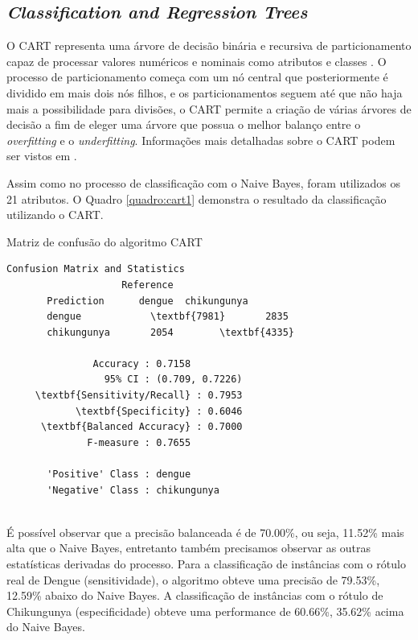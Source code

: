 \subsection{\textit{Classification and Regression Trees}}

O CART representa uma árvore de decisão binária e recursiva de particionamento capaz de processar valores numéricos e nominais como atributos e classes \cite{steinberg2009cart}. O processo de particionamento começa com um nó central que posteriormente é dividido em mais dois nós filhos, e os particionamentos seguem até que não haja mais a possibilidade para divisões, o CART permite a criação de várias árvores de decisão a fim de eleger uma árvore que possua o melhor balanço entre o \textit{overfitting} e o \textit{underfitting}. Informações mais detalhadas sobre o CART podem ser vistos em .

Assim como no processo de classificação com o Naive Bayes, foram utilizados os 21 atributos. O Quadro \ref{quadro:cart1} demonstra o resultado da classificação utilizando o CART.


\begin{quadro}
\caption{\label{quadro:cart1}Matriz de confusão do algoritmo CART}
\begingroup
    \fontsize{10pt}{9pt}\selectfont
    \begin{Verbatim}[commandchars=\\\{\}]
      Confusion Matrix and Statistics
                    Reference
       Prediction      dengue  chikungunya
       dengue            \textbf{7981}       2835
       chikungunya       2054        \textbf{4335}
                                         
               Accuracy : 0.7158         
                 95% CI : (0.709, 0.7226)
     \textbf{Sensitivity/Recall} : 0.7953         
            \textbf{Specificity} : 0.6046         
      \textbf{Balanced Accuracy} : 0.7000
              F-measure : 0.7655        
         
       'Positive' Class : dengue 
       'Negative' Class : chikungunya
  
    \end{Verbatim}  
\endgroup
{}
\end{quadro}

É possível observar que a precisão balanceada é de 70.00\%, ou seja, 11.52\% mais alta que o Naive Bayes, entretanto também precisamos observar as outras estatísticas derivadas do processo. Para a classificação de instâncias com o rótulo real de Dengue (sensitividade), o algoritmo obteve uma precisão de 79.53\%, 12.59\% abaixo do Naive Bayes. A classificação de instâncias com o rótulo de Chikungunya (especificidade) obteve uma performance de 60.66\%, 35.62\% acima do Naive Bayes.

